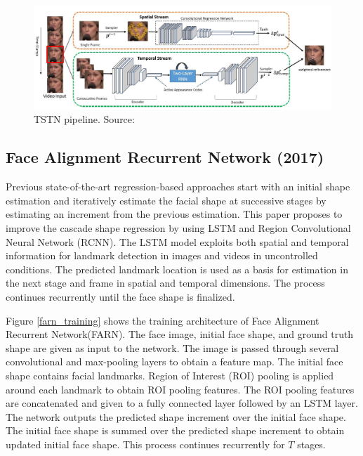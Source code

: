 \documentclass{llncs}
\begin{document}
\begin{figure}
	\centering
	\vspace{-3mm}
	\includegraphics[scale=0.5]{Media/TSTN}
	\vspace{-3mm}
	\caption{TSTN pipeline. Source:\cite{tstn}}
	\label{TSTN}
	\vspace{-3mm}
\end{figure}
\vspace{-8mm}
	\subsection{Face Alignment Recurrent Network (2017) \cite{farn}}

Previous state-of-the-art regression-based approaches start with an initial shape estimation and iteratively estimate the facial shape at successive stages by estimating an increment from the previous estimation. This paper proposes to improve the cascade shape regression by using LSTM and Region Convolutional Neural Network (RCNN). The LSTM model exploits both spatial and temporal information for landmark detection in images and videos in uncontrolled conditions. The predicted landmark location is used as a basis for estimation in the next stage and frame in spatial and temporal dimensions. The process continues recurrently until the face shape is finalized.

Figure \ref{farn_training} shows the training architecture of Face Alignment Recurrent Network(FARN). The face image, initial face shape, and ground truth shape are given as input to the network. The image is passed through several convolutional and max-pooling layers to obtain a feature map. The initial face shape contains facial landmarks. Region of Interest (ROI) pooling is applied around each landmark to obtain ROI pooling features. The ROI pooling features are concatenated and given to a fully connected layer followed by an LSTM layer. The network outputs the predicted shape increment over the initial face shape. The initial face shape is summed over the predicted shape increment to obtain updated initial face shape. This process continues recurrently for $T$ stages.
\end{document}
